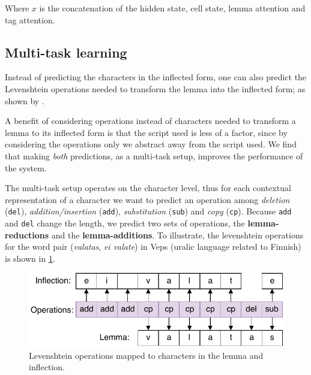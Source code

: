 \documentclass[11pt,a4paper]{article}
\begin{document}
Where $x$ is the concatenation of the hidden state, cell state, lemma
attention and tag attention.


\subsection{Multi-task learning}

Instead of predicting the characters in the inflected form, one can
also predict the Levenshtein operations needed to transform the lemma
into the inflected form; as shown by
\cite{DBLP:conf/conll/MakarovRC17}.

A benefit of considering operations instead of characters needed to
transform a lemma to its inflected form is that the script used is
less of a factor, since by considering the operations only we abstract
away from the script used. We find that making \emph{both}
predictions, as a multi-task setup, improves the performance of the
system.

The multi-task setup operates on the character level, thus for each
contextual representation of a character we want to predict an
operation among \textit{deletion} (\texttt{del}),
\textit{addition/insertion} (\texttt{add}), \textit{substitution}
(\texttt{sub}) and \textit{copy} (\texttt{cp}). Because \texttt{add}
and \texttt{del} change the length, we predict two sets of operations,
the \textbf{lemma-reductions} and the \textbf{lemma-additions}. To
illustrate, the levenshtein operations for the word pair
(\emph{valatas}, \emph{ei valate}) in Veps (uralic language related to
Finnish) is shown in \cref{fig:ops}.


\begin{figure}[ht]
\centering
\includegraphics[scale=0.5]{ops.pdf}
\caption{\label{fig:ops} Levenshtein operations mapped to characters in the lemma and
inflection.}
\end{figure}
\end{document}
